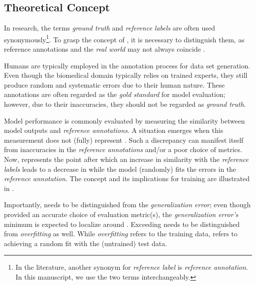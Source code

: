 \subsection{Theoretical Concept}
In  research, the terms \emph{ground truth} and \emph{reference labels} are often used synonymously\footnote{In the literature, another synonym for \emph{reference label} is \emph{reference annotation}.
In this manuscript, we use the two terms interchangeably.}. 
To grasp the concept of , it is necessary to distinguish them, as reference annotations and the \emph{real world} may not always coincide \citep{Ma_2022_CVPR,Yun_2021_CVPR,pmlr-v119-shankar20c}.

% 

Humans are typically employed in the annotation process for  data set generation.
Even though the biomedical domain typically relies on trained experts, they still produce random and systematic errors due to their human nature.
These annotations are often regarded as the \emph{gold standard} for model evaluation; however, due to their inaccuracies, they should not be regarded as \emph{ground truth}.


Model performance is commonly evaluated by measuring the similarity between model outputs and \emph{reference annotations}.
A  situation emerges when this measurement does not (fully) represent .
Such a discrepancy can manifest itself  from inaccuracies in the \emph{reference annotations} and/or a poor choice of metrics.
Now,  represents the point after which an increase in similarity with the \emph{reference labels} leads to a decrease in  while the model (randomly) fits the errors in the \emph{reference annotation}.
The concept and its implications for  training are illustrated in .


Importantly,  needs to be distinguished from the \emph{generalization error}; even though provided an accurate choice of evaluation metric(s),  the \emph{generalization error's} minimum is expected to localize around . 
Exceeding  needs to be distinguished from \emph{overfitting} as well.
While \emph{overfitting} refers to the training data,  refers to achieving a random fit with the (untrained) test data.

